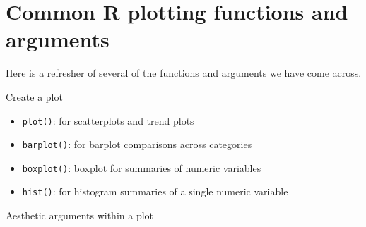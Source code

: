 \documentclass[
  letterpaper,
  DIV=11,
  numbers=noendperiod]{scrreprt}
\providecommand{\tightlist}{%
  \setlength{\itemsep}{0pt}\setlength{\parskip}{0pt}}\usepackage{longtable,booktabs,array}
\begin{document}
\hypertarget{common-r-plotting-functions-and-arguments}{%
\section{Common R plotting functions and
arguments}\label{common-r-plotting-functions-and-arguments}}

Here is a refresher of several of the functions and arguments we have
come across.

Create a plot

\begin{itemize}
\tightlist
\item
  \texttt{plot()}: for scatterplots and trend plots
\item
  \texttt{barplot()}: for barplot comparisons across categories
\item
  \texttt{boxplot()}: boxplot for summaries of numeric variables
\item
  \texttt{hist()}: for histogram summaries of a single numeric variable
\end{itemize}

Aesthetic arguments within a plot
\end{document}
